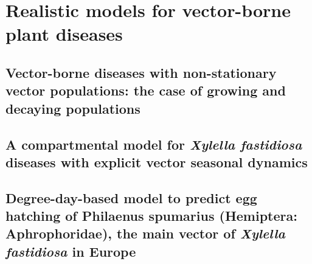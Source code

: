 \documentclass[
	10pt, %
	fleqn, %
	a4paper, %
]{LegrandOrangeBook}
\begin{document}
\part{Realistic models for vector-borne plant diseases}

\chapterspaceabove{6.75cm}
\chapterspacebelow{7.25cm}

\chapter{Vector-borne diseases with non-stationary vector populations: the case
  of growing and decaying populations}
%

\chapterspaceabove{6.75cm}
\chapterspacebelow{7.25cm}

\chapter{A compartmental model for \textit{Xylella fastidiosa} diseases with
  explicit vector seasonal dynamics}
%

\chapterspaceabove{6.75cm}
\chapterspacebelow{7.25cm}

\chapter{Degree-day-based model to predict egg hatching of Philaenus spumarius
  (Hemiptera: Aphrophoridae), the main vector of \textit{Xylella fastidiosa} in
  Europe}
%
\end{document}
